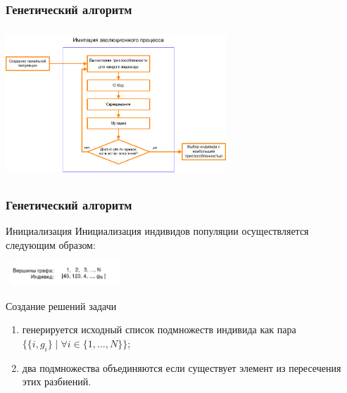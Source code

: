 \documentclass{spbseu}
\begin{document}
    \begin{frame}
		\frametitle{Генетический алгоритм}
        \begin{center}
            \includegraphics[width=313px,height=211px]{images/galgorithm}
        \end{center}
    \end{frame}

    \begin{frame}
        \frametitle{Генетический алгоритм}
        \begin{block}{Инициализация}
            \justifying
            Инициализация индивидов популяции осуществляется следующим образом:
            \vspace{-0.5cm}
            \begin{center}
                \includegraphics[width=170px,height=35px]{images/init}
            \end{center}
        \end{block}
        \pause
        \begin{block}{Создание решений задачи}
            \begin{enumerate}
                \item генерируется исходный список подмножеств индивида как пара $\{\{i, g_i\} \; | \; \forall i \in \{1, \dots, N\}\}$;
                \item два подмножества объединяются если существует элемент из пересечения этих разбиений.
            \end{enumerate}
        \end{block}
    \end{frame}
\end{document}
